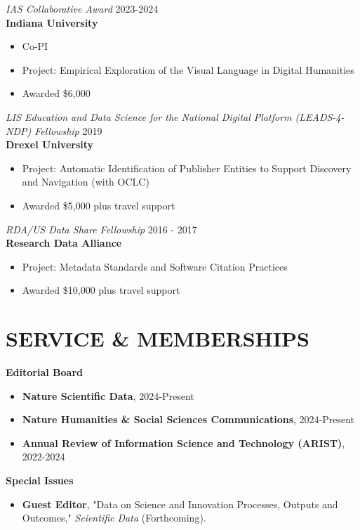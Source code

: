 \documentclass[margin, 10pt]{res} %
\begin{document}
\begin{resume}
{\sl IAS Collaborative Award}  \hfill 2023-2024 \\
\textbf{Indiana University}
\begin{itemize}
\item Co-PI
\item Project: Empirical Exploration of the Visual Language in Digital Humanities
\item Awarded \$6,000
\end{itemize} 

{\sl LIS Education and Data Science for the National Digital Platform (LEADS-4-NDP) Fellowship}  \hfill 2019 \\
\textbf{Drexel University}
\begin{itemize}
\item Project: Automatic Identification of Publisher Entities to Support Discovery and Navigation (with OCLC)
\item Awarded \$5,000 plus travel support
\end{itemize} 

{\sl RDA/US Data Share Fellowship}  \hfill 2016 - 2017 \\
\textbf{Research Data Alliance}
\begin{itemize}
\item Project: Metadata Standards and Software Citation Practices
\item Awarded \$10,000 plus travel support
\end{itemize} 

\section{SERVICE \& MEMBERSHIPS}

\textbf{Editorial Board}
\begin{itemize}
\item \textbf{Nature Scientific Data}, 2024-Present
\item \textbf{Nature Humanities \& Social Sciences Communications}, 2024-Present
\item \textbf{Annual Review of Information Science and Technology (ARIST)}, 2022-2024
\end{itemize}

\textbf{Special Issues}
\begin{itemize}
	\item \textbf{Guest Editor}, "Data on Science and Innovation Processes, Outputs and Outcomes," \textit{Scientific Data} (Forthcoming).
\end{itemize}


\end{resume}
\end{document}
